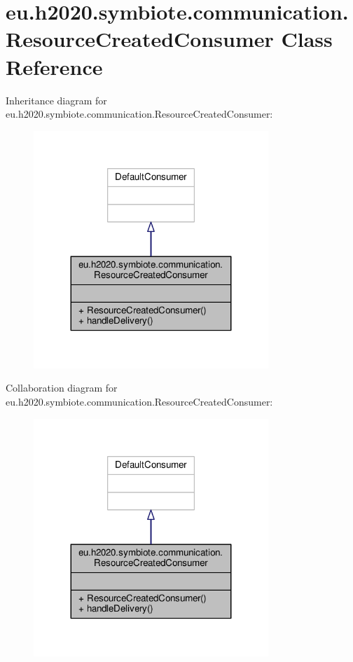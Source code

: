 \hypertarget{classeu_1_1h2020_1_1symbiote_1_1communication_1_1ResourceCreatedConsumer}{}\section{eu.\+h2020.\+symbiote.\+communication.\+Resource\+Created\+Consumer Class Reference}
\label{classeu_1_1h2020_1_1symbiote_1_1communication_1_1ResourceCreatedConsumer}


Inheritance diagram for eu.\+h2020.\+symbiote.\+communication.\+Resource\+Created\+Consumer\+:
\nopagebreak
\begin{figure}[H]
\begin{center}
\leavevmode
\includegraphics[width=251pt]{classeu_1_1h2020_1_1symbiote_1_1communication_1_1ResourceCreatedConsumer__inherit__graph}
\end{center}
\end{figure}


Collaboration diagram for eu.\+h2020.\+symbiote.\+communication.\+Resource\+Created\+Consumer\+:
\nopagebreak
\begin{figure}[H]
\begin{center}
\leavevmode
\includegraphics[width=251pt]{classeu_1_1h2020_1_1symbiote_1_1communication_1_1ResourceCreatedConsumer__coll__graph}
\end{center}
\end{figure}
